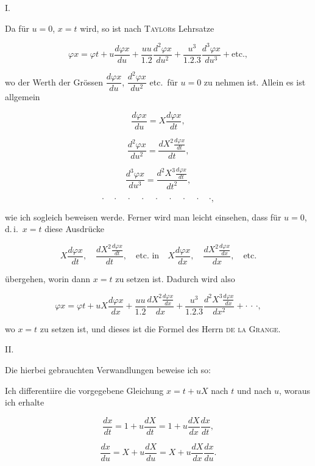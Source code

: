 
\begin{center}
I.
\end{center}

\noindent\hspace*{\parindent}Da für $u = 0$, $x = t$ wird, so ist nach \textsc{Taylor}s Lehrsatze

\[
\varphi x = \varphi t + u \frac{d\varphi x}{du} + \frac{uu}{1.2}\frac{d^2\varphi x}{du^2}
+ \frac{u^3}{1.2.3}\frac{d^3\varphi x}{du^3} + \text{etc.},
\]

\noindent wo der Werth der Grössen $\dfrac{d\varphi x}{du}$, $\dfrac{d^2\varphi x}{du^2}$ etc.\ für
$u = 0$ zu nehmen ist. Allein es ist allgemein

\[
\frac{d\varphi x}{du} = X\frac{d\varphi x}{dt},
\]

\[
\frac{d^2\varphi x}{du^2} = \frac{dX^2 \frac{d\varphi x}{dt}}{dt},
\]

\[
\frac{d^3\varphi x}{du^3} = \frac{d^2X^3 \frac{d\varphi x}{dt}}{dt^2},
\]

\[
\cdot\quad\cdot\quad\cdot\quad\cdot\quad\cdot\quad\cdot\quad\cdot\quad\cdot\quad\cdot,
\]

\noindent wie ich sogleich beweisen werde. Ferner wird man leicht einsehen, dass für $u = 0$, d.\,i.\
$x = t$ diese Ausdrücke

\[
X\frac{d\varphi x}{dt},\quad \frac{dX^2 \frac{d\varphi x}{dt}}{dt},\quad
\text{etc.\ in}\quad X\frac{d\varphi x}{dx},\quad \frac{dX^2 \frac{d\varphi x}{dx}}{dx},\quad \text{etc.}
\]

\noindent übergehen, worin dann $x = t$ zu setzen ist. Dadurch wird also

\[
\varphi x = \varphi t + uX\frac{d\varphi x}{dx} + \frac{uu}{1.2}\frac{dX^2 \frac{d\varphi x}{dx}}{dx}
+ \frac{u^3}{1.2.3}\frac{d^2X^3 \frac{d\varphi x}{dx}}{dx^2} + \cdot\,\cdot\,\cdot,
\]

\noindent wo $x = t$ zu setzen ist, und dieses ist die Formel des Herrn \textsc{de la Grange}.

\medskip

\begin{center}
II.
\end{center}

\noindent\hspace*{\parindent}Die hierbei gebrauchten Verwandlungen beweise ich so:

\noindent\hspace*{\parindent}Ich differentiire die vorgegebene Gleichung $x = t + uX$ nach $t$ und nach $u$,
woraus ich erhalte

\[
\frac{dx}{dt} = 1 + u\frac{dX}{dt} = 1 + u\frac{dX}{dx}\frac{dx}{dt},
\]

\[
\frac{dx}{du} = X + u\frac{dX}{du} = X + u\frac{dX}{dx}\frac{dx}{du}.
\]
